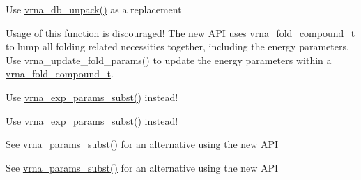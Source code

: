 \begin{DoxyRefList}
\item[\label{deprecated__deprecated000184}%
\Hypertarget{deprecated__deprecated000184}%
Global \hyperlink{group__struct__utils__deprecated_ga071c6921efe1eb974f115ee6fefa3c39}{unpack\+\_\+structure} (const char $\ast$packed)]Use \hyperlink{group__struct__utils__dot__bracket_ga6490adff857d84ce06e6f379ae3a4512}{vrna\+\_\+db\+\_\+unpack()} as a replacement


\item[\label{deprecated__deprecated000025}%
\Hypertarget{deprecated__deprecated000025}%
Global \hyperlink{alifold_8h_ac484c6bd429bafbd353b91044508d8e9}{update\+\_\+alifold\+\_\+params} (void)]Usage of this function is discouraged! The new A\+PI uses \hyperlink{group__fold__compound_ga1b0cef17fd40466cef5968eaeeff6166}{vrna\+\_\+fold\+\_\+compound\+\_\+t} to lump all folding related necessities together, including the energy parameters. Use vrna\+\_\+update\+\_\+fold\+\_\+params() to update the energy parameters within a \hyperlink{group__fold__compound_ga1b0cef17fd40466cef5968eaeeff6166}{vrna\+\_\+fold\+\_\+compound\+\_\+t}.  
\item[\label{deprecated__deprecated000117}%
\Hypertarget{deprecated__deprecated000117}%
Global \hyperlink{group__part__func__global__deprecated_ga6e0f36c1f9b7d9dd4bfbad914c1119e5}{update\+\_\+co\+\_\+pf\+\_\+params} (int length)]Use \hyperlink{group__energy__parameters_ga8e7ac4fab3b0cc03afbc134eaafb3525}{vrna\+\_\+exp\+\_\+params\+\_\+subst()} instead! 
\item[\label{deprecated__deprecated000118}%
\Hypertarget{deprecated__deprecated000118}%
Global \hyperlink{group__part__func__global__deprecated_ga75465d7e8793db68a434d83df9a2e794}{update\+\_\+co\+\_\+pf\+\_\+params\+\_\+par} (int length, vrna\+\_\+exp\+\_\+param\+\_\+t $\ast$parameters)]Use \hyperlink{group__energy__parameters_ga8e7ac4fab3b0cc03afbc134eaafb3525}{vrna\+\_\+exp\+\_\+params\+\_\+subst()} instead! 
\item[\label{deprecated__deprecated000033}%
\Hypertarget{deprecated__deprecated000033}%
Global \hyperlink{group__mfe__global__deprecated_ga4fcbf34e77b99bfbb2333d2ab0c41a57}{update\+\_\+cofold\+\_\+params} (void)]See \hyperlink{group__energy__parameters_ga5d1909208f7ea3baa98b75afaa1f62ca}{vrna\+\_\+params\+\_\+subst()} for an alternative using the new A\+PI 
\item[\label{deprecated__deprecated000034}%
\Hypertarget{deprecated__deprecated000034}%
Global \hyperlink{group__mfe__global__deprecated_gaaadbd28b4e428710529ab4098fdacad3}{update\+\_\+cofold\+\_\+params\+\_\+par} (vrna\+\_\+param\+\_\+t $\ast$parameters)]See \hyperlink{group__energy__parameters_ga5d1909208f7ea3baa98b75afaa1f62ca}{vrna\+\_\+params\+\_\+subst()} for an alternative using the new A\+PI 

\end{DoxyRefList}
